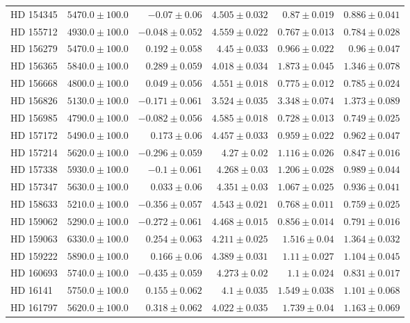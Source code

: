 \begin{longtable*}{lrrrrr}
HD 154345 & $5470.0\pm 100.0$ & $-0.07\pm 0.06$ & $4.505\pm 0.032$ & $0.87\pm 0.019$ & $0.886\pm 0.041$ \\ 
HD 155712 & $4930.0\pm 100.0$ & $-0.048\pm 0.052$ & $4.559\pm 0.022$ & $0.767\pm 0.013$ & $0.784\pm 0.028$ \\ 
HD 156279 & $5470.0\pm 100.0$ & $0.192\pm 0.058$ & $4.45\pm 0.033$ & $0.966\pm 0.022$ & $0.96\pm 0.047$ \\ 
HD 156365 & $5840.0\pm 100.0$ & $0.289\pm 0.059$ & $4.018\pm 0.034$ & $1.873\pm 0.045$ & $1.346\pm 0.078$ \\ 
HD 156668 & $4800.0\pm 100.0$ & $0.049\pm 0.056$ & $4.551\pm 0.018$ & $0.775\pm 0.012$ & $0.785\pm 0.024$ \\ 
HD 156826 & $5130.0\pm 100.0$ & $-0.171\pm 0.061$ & $3.524\pm 0.035$ & $3.348\pm 0.074$ & $1.373\pm 0.089$ \\ 
HD 156985 & $4790.0\pm 100.0$ & $-0.082\pm 0.056$ & $4.585\pm 0.018$ & $0.728\pm 0.013$ & $0.749\pm 0.025$ \\ 
HD 157172 & $5490.0\pm 100.0$ & $0.173\pm 0.06$ & $4.457\pm 0.033$ & $0.959\pm 0.022$ & $0.962\pm 0.047$ \\ 
HD 157214 & $5620.0\pm 100.0$ & $-0.296\pm 0.059$ & $4.27\pm 0.02$ & $1.116\pm 0.026$ & $0.847\pm 0.016$ \\ 
HD 157338 & $5930.0\pm 100.0$ & $-0.1\pm 0.061$ & $4.268\pm 0.03$ & $1.206\pm 0.028$ & $0.989\pm 0.044$ \\ 
HD 157347 & $5630.0\pm 100.0$ & $0.033\pm 0.06$ & $4.351\pm 0.03$ & $1.067\pm 0.025$ & $0.936\pm 0.041$ \\ 
HD 158633 & $5210.0\pm 100.0$ & $-0.356\pm 0.057$ & $4.543\pm 0.021$ & $0.768\pm 0.011$ & $0.759\pm 0.025$ \\ 
HD 159062 & $5290.0\pm 100.0$ & $-0.272\pm 0.061$ & $4.468\pm 0.015$ & $0.856\pm 0.014$ & $0.791\pm 0.016$ \\ 
HD 159063 & $6330.0\pm 100.0$ & $0.254\pm 0.063$ & $4.211\pm 0.025$ & $1.516\pm 0.04$ & $1.364\pm 0.032$ \\ 
HD 159222 & $5890.0\pm 100.0$ & $0.166\pm 0.06$ & $4.389\pm 0.031$ & $1.11\pm 0.027$ & $1.104\pm 0.045$ \\ 
HD 160693 & $5740.0\pm 100.0$ & $-0.435\pm 0.059$ & $4.273\pm 0.02$ & $1.1\pm 0.024$ & $0.831\pm 0.017$ \\ 
HD 16141 & $5750.0\pm 100.0$ & $0.155\pm 0.062$ & $4.1\pm 0.035$ & $1.549\pm 0.038$ & $1.101\pm 0.068$ \\ 
HD 161797 & $5620.0\pm 100.0$ & $0.318\pm 0.062$ & $4.022\pm 0.035$ & $1.739\pm 0.04$ & $1.163\pm 0.069$ \\ 

\end{longtable*}
